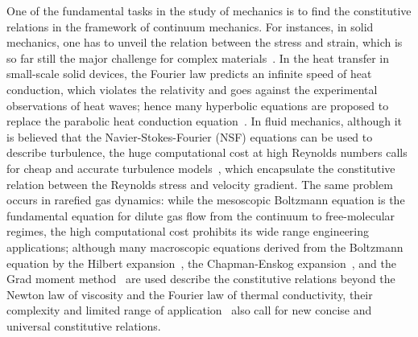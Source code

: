 \documentclass[lineno]{jfm}
\begin{document}
One of the fundamental tasks in the study of mechanics is to find the constitutive relations in the framework of continuum mechanics. For instances, in solid mechanics, one has to unveil the relation between the stress and strain, which is so far still the major challenge for complex materials~\citep{Eringen1976,cite1}. In the heat transfer in small-scale solid devices, the Fourier law predicts an infinite speed of heat conduction, which violates the relativity and goes against the experimental observations of heat waves; hence many hyperbolic equations are proposed to replace the parabolic heat conduction equation~\citep{cite4}.  In fluid mechanics, although it is believed that the Navier-Stokes-Fourier (NSF) equations can be used to describe turbulence, the huge computational cost at high Reynolds numbers calls for cheap and accurate turbulence models~\citep{Wilcox}, which encapsulate the constitutive relation between the Reynolds stress and velocity gradient. The same problem occurs in 
rarefied gas dynamics: while the mesoscopic Boltzmann equation is the fundamental equation for dilute gas flow from the continuum to free-molecular regimes, the high computational cost prohibits its wide range engineering applications; although many macroscopic equations derived from the Boltzmann equation by the Hilbert expansion~\citep{Hilbert1912,Sone2002Book}, the Chapman-Enskog expansion~\citep{Chapman1916,Enskog1917,CE}, and the Grad moment method~\citep{Grad1949,henning,TorrihonReview2016} are used describe the constitutive relations beyond the Newton law of viscosity and the Fourier law of thermal conductivity, their complexity and limited range of application~\citep{cite8} also call for new concise and universal constitutive relations.
\end{document}
